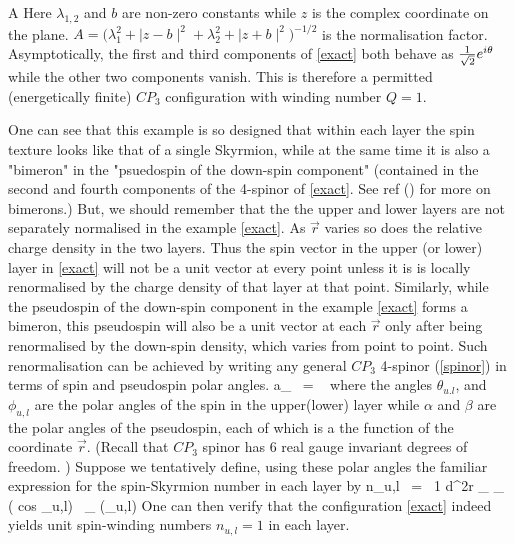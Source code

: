 \beq   A  \label{exact} \eeq
Here $\lambda_{1,2}$  and $b$ are non-zero constants while $z$ is the 
complex coordinate on the plane. $ A = 
\big(\lambda_{1}^{2} + \mid z-b \mid^2 + \lambda_{2}^{2}
 +   \mid z+b \mid^2 \big)^{-1/2}$ is the normalisation factor. 
Asymptotically, the first and third components  of \ref{exact} both 
behave as ${1 \over \sqrt{2}}
  e^{i\theta}$ while the other two components vanish. This is therefore a
  permitted (energetically finite) $CP_{3}$ configuration with winding
  number $Q = 1$. 
  
  One can see that this example is so designed that within each layer 
  the spin texture looks like that of a single 
Skyrmion, while at the same time it is also a "bimeron" in the "psuedospin
of  the down-spin 
component" (contained in the second and fourth components of the 4-spinor of
\ref{exact}. See ref (\cite{Ghosh2}) for more on bimerons.) 
But, we should remember that the the upper and lower layers are
not separately normalised in the example \ref{exact}. As ${\vec r}$ varies 
so does the relative
charge density in the two layers. Thus the spin vector in the upper (or lower)
 layer in \ref{exact} will not be a unit vector at every point unless it is
 is locally renormalised by the charge density of that layer at that point. 
 Similarly, 
 while the pseudospin of the down-spin component in the example \ref{exact}
   forms a  bimeron, this pseudospin will also be a unit vector 
   at each ${\vec r}$ only after being renormalised by the down-spin density, 
   which varies from point to point. Such renormalisation can be
   achieved by writing any general
   $CP_{3}$ 4-spinor (\ref{spinor}) in terms of spin and pseudospin 
polar angles.
\beq  a_{\sigma} \ = \  \label{angles} \eeq
where the angles 
$\theta_{u.l}$, and  $\phi_{u,l}$ are the polar angles of the spin in the
upper(lower) layer while $\alpha$ and $\beta$ are the polar angles of the
pseudospin, each of which is a 
the function of the coordinate ${\vec r}$. (Recall that  $CP_{3}$ spinor 
has 6 real gauge invariant degrees of freedom. ) Suppose we   tentatively 
define, using these polar angles
 the familiar expression for the  spin-Skyrmion number in each layer by
\beq  n_{u,l}  \ =  \ {1 \pi}\int d^{2}r \epsilon_{\mu \nu} 
 \partial_{\mu} 
( cos \theta_{u,l}) \ \partial_{\nu} (\phi_{u,l}) \label{Qs}\eeq
One can then verify that the configuration \ref{exact} indeed yields unit
 spin-winding numbers $n_{u,l} =1 $ in each layer.
 
